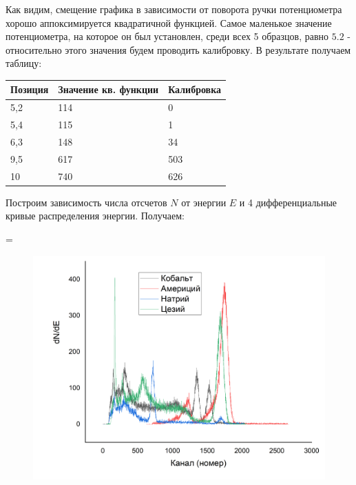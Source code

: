 \documentclass[%
 reprint,
 amsmath,amssymb,
 aps,
]{revtex4-2}
\begin{document}
Как видим, смещение графика в зависимости от поворота ручки потенциометра хорошо аппоксимируется квадратичной функцией. Самое маленькое значение потенциометра, на которое он был установлен, среди всех 5 образцов, равно $5.2$ - относительно этого значения будем проводить калибровку. В результате получаем таблицу:

\begin{table}[h!]
	\begin{tabular}{|l|l|l|}
		\hline
		Позиция & Значение кв. функции & Калибровка \\ \hline
		5,2     & 114                  & 0          \\ \hline
		5,4     & 115                  & 1          \\ \hline
		6,3     & 148                  & 34         \\ \hline
		9,5     & 617                  & 503        \\ \hline
		10      & 740                  & 626        \\ \hline
	\end{tabular}
\end{table}


Построим зависимость числа отсчетов $N$ от энергии $E$ и 4 дифференциальные кривые распределения энергии. Получаем:

=

\begin{figure}[]
	\includegraphics[scale=0.25]{3.png}
\end{figure}
\end{document}
